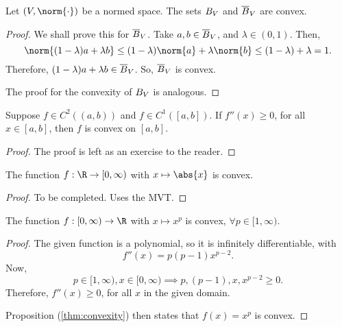 \begin{nprop}
  Let $(V, \norm{\cdot})$ be a normed space. The sets $B_{V}$ and $\overline{B}_{V}$ are convex.
\end{nprop}
\begin{proof}
  We shall prove this for $\overline{B}_{V}$. Take $a, b \in \overline{B}_{V}$, and $\lambda \in (0,1)$. Then,
  \begin{equation*}
    \norm{(1-\lambda) a + \lambda b}
    \leq (1-\lambda) \norm{a} + \lambda \norm{b}
    \leq (1-\lambda) + \lambda
     = 1.
  \end{equation*}
  Therefore, $(1-\lambda) a + \lambda b \in \overline{B}_{V}$. So, $\overline{B}_{V}$ is convex.

  The proof for the convexity of $B_{V}$ is analogous.
\end{proof}

\begin{nprop}
\label{thm:convexity}
  Suppose $f \in C^2 ((a,b))$ and $f \in C^1 ([a,b])$. If $f''(x) \geq 0$, for all $x \in [a,b]$, then $f$ is convex on $[a,b]$.
\end{nprop}
\begin{proof}
  The proof is left as an exercise to the reader.
\end{proof}

\begin{nlemma}
  The function $f : \R \to [0,\infty)$ with $x \mapsto \abs{x}$ is convex.
\end{nlemma}
\begin{proof}
  To be completed. Uses the MVT.
\end{proof}

\begin{nlemma}
  The function $f : [0,\infty) \to \R$ with $x \mapsto x^p$ is convex, $\forall p \in [1,\infty)$.
\end{nlemma}
\begin{proof}
  The given function is a polynomial, so it is infinitely differentiable, with
  \begin{equation*}
    f''(x) = p(p-1)x^{p-2}.
  \end{equation*}
  Now,
  \begin{equation*}
    p \in [1,\infty), x \in [0,\infty) \implies p, (p-1), x, x^{p-2} \geq 0.
  \end{equation*}
  Therefore, $f''(x) \geq 0$, for all $x$ in the given domain.

  Proposition (\ref{thm:convexity}) then states that $f(x) = x^p$ is convex.
\end{proof}

